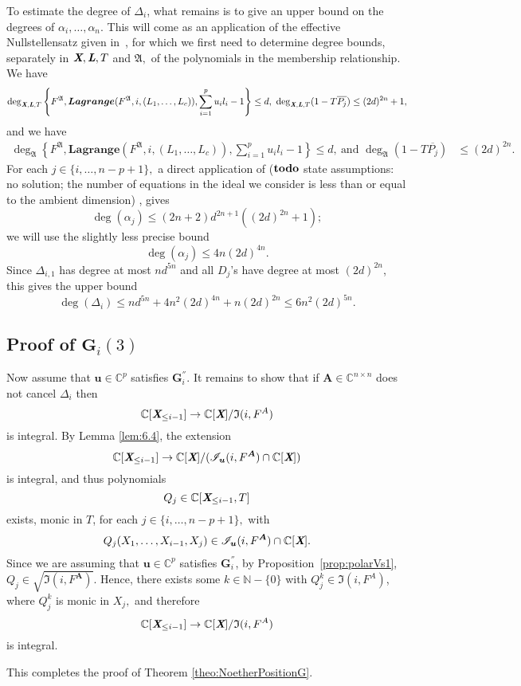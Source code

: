 \documentclass[a4paper]{article}
\def\A{\mathfrak{A}}
\def\Lb{\textit{\textbf{L}}}
\def\Xb{\textit{\textbf{X}}}
\def\mA{{\bm A}}
\def\ub{{\bm u}}
\def\pjb{\overline{P_{j}}}
\def\D{\Delta}
\def\C{\mathbb{C}}
\def\IiA{\mathfrak{I}(i,F^A)}
\def\IiAr{\sqrt{\mathfrak{I}(i,F^{\mA})}}
\def\lagFfA{{\bm{Lagrange}}(F^{\A},i,(L_1,\hdots,L_c))}
\def\IilA{\mathscr{I}_{\ub}(i,F^{\mA})}
\def\udl{\sum_{i=1}^pu_il_i}
\def\td{{\bf todo}}
\begin{document}
\noindent
To estimate the degree of $\D_{i}$, what remains is to give an upper
bound on the degrees of $\alpha_i,\dots,\alpha_n$. This will come as an
application of the effective Nullstellensatz given in~\cite{EN}, for
which we first need to determine degree bounds, separately in $\Xb,\Lb,T$
and $\A,$ of the polynomials in the membership relationship. We have
\begin{align*}
\deg_{\Xb,\Lb,T}
\left\{ 
F^{\A},\lagFfA, \udl-1
\right\}
\leq d, ~
\deg_{\Xb,\Lb,T}(1-T\pjb) \leq (2d)^{2n} +1, 
\end{align*}
and we have 
\begin{align*}
\deg_{\A}  
\left\{ 
F^{\A},\lagFfA, \udl-1
\right\} 
\leq d,~\textrm{and }
\deg_{\A}(1-T\pjb)& \leq (2d)^{2n}.
\end{align*}
For each $j \in \{i,\hdots,n-p+1\},$ a direct application of ($\td$ state assumptions: no solution; the number of equations in the ideal we consider is less than or equal to the ambient dimension) \cite[Theorem
0.5]{EN}, gives 
\[
\deg(\alpha_j) \le (2n+2)d^{2n+1}((2d)^{2n}+1);
\]
we will use
the slightly less precise bound \[\deg(\alpha_j) \le 4n(2d)^{4n}.\] Since $\D_{i,1}$ has degree at most
$nd^{5n}$ and all $D_j$'s have degree at most $(2d)^{2n}$, this gives
the upper bound
$$\deg(\D_i) \le nd^{5n} +  4n^2(2d)^{4n} + n(2d)^{2n} \leq 6n^2(2d)^{5n}.$$


\subsection{Proof of $\textbf{G}_i(3)$}
Now assume that $\ub \in \C^p$ satisfies $\bm G_i^{''}$. It remains to show that if $\mA \in \C^{n\times n}$ does not cancel $\D_{i}$ then
\[
 \C[\Xb_{\leq i-1}]\rightarrow \C[\Xb]/\IiA
\]
is integral. 
\noindent
By Lemma \ref{lem:6.4}, the extension
\[
 \C[\Xb_{\leq i-1}]\rightarrow \C[\Xb]/(\IilA \cap \C[\Xb])
\]
is integral, and thus polynomials 
\[
Q_j \in \C[\Xb_{\leq i-1},T]
\]
exists, monic in $T$, for each $j \in \{i,\hdots,n-p+1\},$ with
\begin{align*}
Q_j(X_1,\hdots,X_{i-1},X_j) \in \IilA \cap \C[\Xb].
\end{align*}
%
Since we are assuming that $\ub \in \C^p$ satisfies $\bm G_i^{''}$, by Proposition~\ref{prop:polarVs1}, $Q_j \in \IiAr.$ Hence, there exists some $k \in \mathbb{N}-\{0\}$ with $Q_j^{k} \in\IiA$, where $Q_j^k$ is monic in $X_j,$ and therefore
\[
 \C[\Xb_{\leq i-1}]\rightarrow \C[\Xb]/\IiA
\]
is integral.
\par 
This completes the proof of Theorem \ref{theo:NoetherPositionG}.
\end{document}

